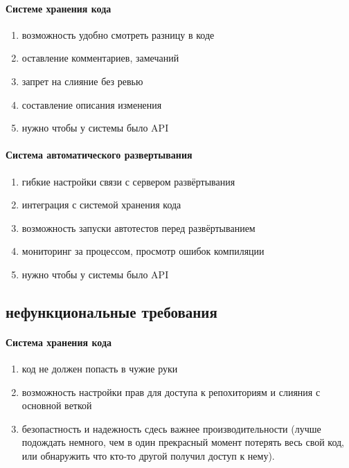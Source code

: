 \documentclass{article}
\begin{document}
\paragraph{Системе хранения кода}
\begin{enumerate}
    \item{возможность удобно смотреть разницу в коде}
    \item{оставление комментариев, замечаний}
    \item{запрет на слияние без ревью}
    \item{составление описания изменения}
    \item{нужно чтобы у системы было API}
\end{enumerate}

\paragraph{Система автоматического развертывания}
\begin{enumerate}
    \item{гибкие настройки связи с сервером развёртывания}
    \item{интеграция с системой хранения кода}
    \item{возможность запуски автотестов перед развёртыванием}
    \item{мониторинг за процессом, просмотр ошибок компиляции}
    \item{нужно чтобы у системы было API}
\end{enumerate}

\subsection{нефункциональные требования}
\paragraph{Система хранения кода}
\begin{enumerate}
    \item{код не должен попасть в чужие руки}
    \item{возможность настройки прав для доступа к репохиториям и слияния с основной веткой}
    \item{безопастность и надежность сдесь важнее производительности (лучше подождать немного, чем в один прекрасный момент потерять весь свой код, или обнаружить что кто-то другой получил доступ к нему).}
\end{enumerate}
\end{document}
